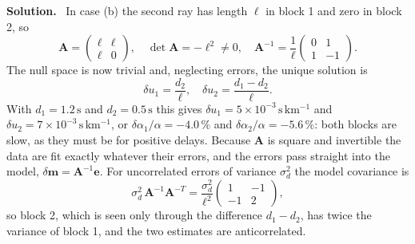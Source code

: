 \documentclass[a4paper,12pt]{paper}
\newenvironment{solution}{\par\noindent\textbf{Solution.}\ }{\par\medskip}
\begin{document}
\begin{solution}
In case (b) the second ray has length $\ell$ in block 1 and zero in block 2, so
\begin{equation}
    \mathbf{A} = \begin{pmatrix} \ell & \ell \\ \ell & 0 \end{pmatrix},\quad
    \det\mathbf{A} = -\ell^{2} \neq 0,\quad
    \mathbf{A}^{-1} = \frac{1}{\ell}\begin{pmatrix} 0 & 1 \\ 1 & -1 \end{pmatrix}.
    \label{eq:4}
\end{equation}
The null space is now trivial and, neglecting errors, the unique solution is
\begin{equation}
    \delta u_{1} = \frac{d_{2}}{\ell},\quad \delta u_{2} = \frac{d_{1}-d_{2}}{\ell}.
    \label{eq:5}
\end{equation}
With $d_{1}=1.2\,\mathrm{s}$ and $d_{2}=0.5\,\mathrm{s}$ this gives $\delta u_{1} =
5\times10^{-3}\,\mathrm{s\,km^{-1}}$ and $\delta u_{2}=7\times10^{-3}\,\mathrm{s\,km^{-1}}$, or
$\delta\alpha_{1}/\alpha = -4.0\,\%$ and $\delta\alpha_{2}/\alpha = -5.6\,\%$: both blocks are slow,
as they must be for positive delays. Because $\mathbf{A}$ is square and invertible the data are fit
exactly whatever their errors, and the errors pass straight into the model,
$\delta\mathbf{m}=\mathbf{A}^{-1}\mathbf{e}$. For uncorrelated errors of variance $\sigma_{d}^{2}$ the
model covariance is
\begin{equation}
    \sigma_{d}^{2}\,\mathbf{A}^{-1}\mathbf{A}^{-T} = \frac{\sigma_{d}^{2}}{\ell^{2}}
    \begin{pmatrix} 1 & -1 \\ -1 & 2 \end{pmatrix},
    \label{eq:6}
\end{equation}
so block 2, which is seen only through the difference $d_{1}-d_{2}$, has twice the variance of block 1,
and the two estimates are anticorrelated.


\end{solution}
\end{document}
